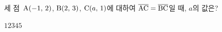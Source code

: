 세 점~$\mathrm{A}(-1,\,2)$, $\mathrm{B}(2,\,3)$, $\mathrm{C}(a,\,1)$에 대하여 $\overline{\mathrm{AC}}=\overline{\mathrm{BC}}$일 때, $a$의 값은?
\begin{choices32}{$1$}{$2$}{$3$}{$4$}{$5$}\end{choices32}

